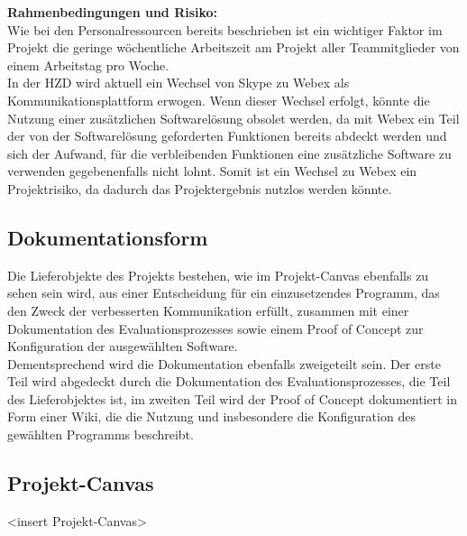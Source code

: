 \documentclass[ThesisDJ.tex]{subfiles}
\begin{document}
	\textbf{Rahmenbedingungen und Risiko:}\medskip\\
	Wie bei den Personalressourcen bereits beschrieben ist ein wichtiger Faktor im Projekt die geringe wöchentliche Arbeitszeit am Projekt aller Teammitglieder von einem Arbeitstag pro Woche.\\	
	In der HZD wird aktuell ein Wechsel von Skype zu Webex als Kommunikationsplattform erwogen. Wenn dieser Wechsel erfolgt, könnte die Nutzung einer zusätzlichen Softwarelösung obsolet werden, da mit Webex ein Teil der von der Softwarelösung geforderten Funktionen bereits abdeckt werden und sich der Aufwand, für die verbleibenden Funktionen eine zusätzliche Software zu verwenden gegebenenfalls nicht lohnt. Somit ist ein Wechsel zu Webex ein Projektrisiko, da dadurch das Projektergebnis nutzlos werden könnte. 
	
	\subsection{Dokumentationsform}
	
	Die Lieferobjekte des Projekts bestehen, wie im Projekt-Canvas ebenfalls zu sehen sein wird, aus einer Entscheidung für ein einzusetzendes Programm, das den Zweck der verbesserten Kommunikation erfüllt, zusammen mit einer Dokumentation des Evaluationsprozesses sowie einem Proof of Concept zur Konfiguration der ausgewählten Software.\\
	Dementsprechend wird die Dokumentation ebenfalls zweigeteilt sein. Der erste Teil wird abgedeckt durch die Dokumentation des Evaluationsprozesses, die Teil des Lieferobjektes ist, im zweiten Teil wird der Proof of Concept dokumentiert in Form einer Wiki, die die Nutzung und insbesondere die Konfiguration des gewählten Programms beschreibt. 
	
	\subsection{Projekt-Canvas}
	<insert Projekt-Canvas>
\end{document}
